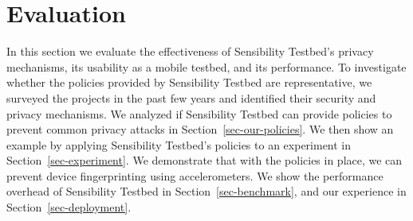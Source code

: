\section{Evaluation}\label{sec-eval}

In this section we evaluate the effectiveness of Sensibility Testbed's 
privacy mechanisms, its usability as a mobile testbed, and its 
performance. To investigate whether the policies provided by 
Sensibility Testbed are representative, we surveyed the projects
in the past few years and identified their security and privacy 
mechanisms. We analyzed if Sensibility Testbed can provide policies 
to prevent common privacy attacks in Section~\ref{sec-our-policies}. 
We then show an example by applying Sensibility Testbed's 
policies to an experiment in Section~\ref{sec-experiment}. We 
demonstrate that with the policies in place, we can prevent device
fingerprinting using accelerometers. We show the performance overhead of 
Sensibility Testbed in Section~\ref{sec-benchmark}, and our 
experience in Section~\ref{sec-deployment}.



